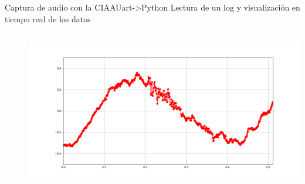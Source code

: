  \begin{frame}{Captura de audio con la CIAA}{Uart->Python}
    \handsonicon
    Lectura de un log y visualización en tiempo real de los datos
       \begin{columns}[c]
          \hspace{2pt}
          \begin{column}{.3\textwidth}
             
          \end{column}
          \hspace{2pt}
          \vrule
          \hspace{2pt}
          \begin{column}{.3\textwidth}
             
          \end{column}
          \hspace{2pt}
          \vrule
          \hspace{2pt}
          \begin{column}{.4\textwidth}
             \includegraphics[width=\textwidth]{2_clase/ciaa/psf1/visualize.png}
          \end{column}
          \hspace{2pt}
       \end{columns}
       \vfill
    \end{frame}

